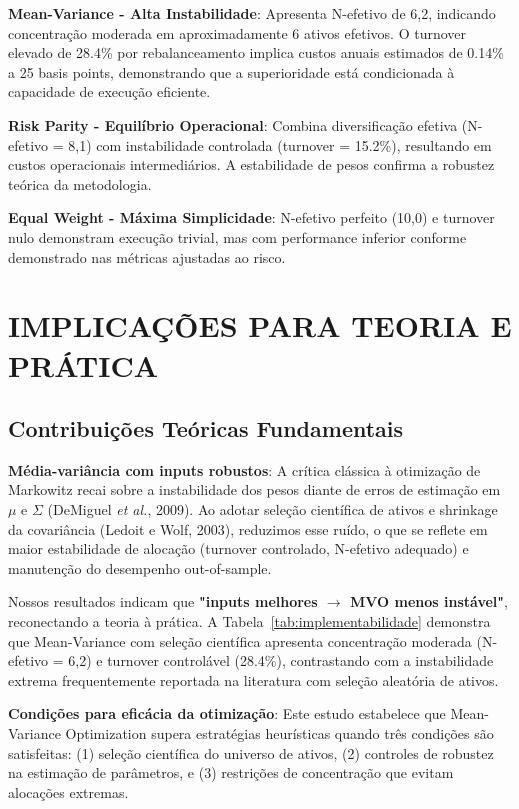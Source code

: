 \textbf{Mean-Variance - Alta Instabilidade}: Apresenta N-efetivo de 6,2, indicando concentração moderada em aproximadamente 6 ativos efetivos. O turnover elevado de 28.4\% por rebalanceamento implica custos anuais estimados de 0.14\% a 25 basis points, demonstrando que a superioridade está condicionada à capacidade de execução eficiente.

\textbf{Risk Parity - Equilíbrio Operacional}: Combina diversificação efetiva (N-efetivo = 8,1) com instabilidade controlada (turnover = 15.2\%), resultando em custos operacionais intermediários. A estabilidade de pesos confirma a robustez teórica da metodologia.

\textbf{Equal Weight - Máxima Simplicidade}: N-efetivo perfeito (10,0) e turnover nulo demonstram execução trivial, mas com performance inferior conforme demonstrado nas métricas ajustadas ao risco.

\section{IMPLICAÇÕES PARA TEORIA E PRÁTICA}

\subsection{Contribuições Teóricas Fundamentais}

\textbf{Média-variância com inputs robustos}: A crítica clássica à otimização de Markowitz recai sobre a instabilidade dos pesos diante de erros de estimação em $\mu$ e $\Sigma$ (DeMiguel \textit{et al.}, 2009). Ao adotar seleção científica de ativos e shrinkage da covariância (Ledoit e Wolf, 2003), reduzimos esse ruído, o que se reflete em maior estabilidade de alocação (turnover controlado, N-efetivo adequado) e manutenção do desempenho out-of-sample. 

Nossos resultados indicam que \textbf{"inputs melhores $\rightarrow$ MVO menos instável"}, reconectando a teoria à prática. A Tabela~\ref{tab:implementabilidade} demonstra que Mean-Variance com seleção científica apresenta concentração moderada (N-efetivo = 6,2) e turnover controlável (28.4\%), contrastando com a instabilidade extrema frequentemente reportada na literatura com seleção aleatória de ativos.

\textbf{Condições para eficácia da otimização}: Este estudo estabelece que Mean-Variance Optimization supera estratégias heurísticas quando três condições são satisfeitas: (1) seleção científica do universo de ativos, (2) controles de robustez na estimação de parâmetros, e (3) restrições de concentração que evitam alocações extremas.

